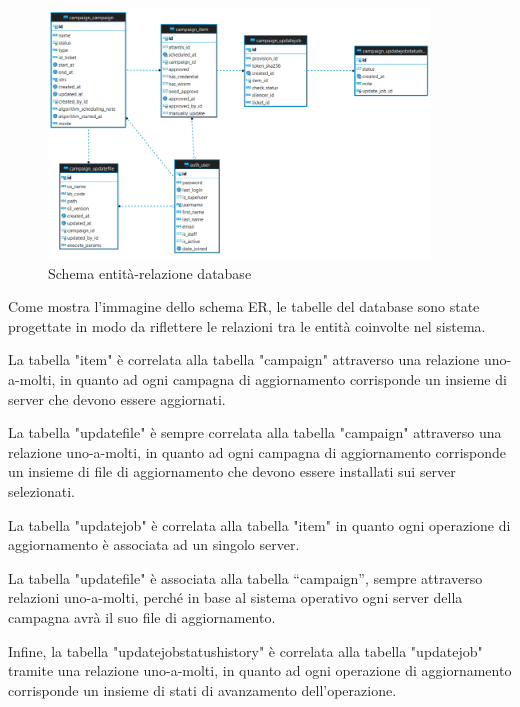 \begin{figure}[H]
  \begin{flushright}
    \centering
    \includegraphics[width=0.90\textwidth]{imgs/ER_schema.png}
    \caption{Schema entità-relazione database}
    \label{fig:Schema entità-relazione database}
  \end{flushright}
\end{figure}

Come mostra l’immagine dello schema ER, le tabelle del database sono state 
progettate in modo da riflettere le relazioni tra le entità coinvolte 
nel sistema.

La tabella "item" è correlata alla tabella "campaign" attraverso una 
relazione uno-a-molti, in quanto ad ogni campagna di aggiornamento 
corrisponde un insieme di server che devono essere aggiornati.

La tabella "updatefile" è sempre correlata alla tabella "campaign" 
attraverso una relazione uno-a-molti, in quanto ad ogni campagna di 
aggiornamento corrisponde un insieme di file di aggiornamento che 
devono essere installati sui server selezionati.

La tabella "updatejob" è correlata alla tabella "item" in quanto ogni 
operazione di aggiornamento è associata ad un singolo server.

La tabella "updatefile" è associata alla tabella “campaign”, sempre 
attraverso relazioni uno-a-molti, perché in base al sistema operativo 
ogni server della campagna avrà il suo file di aggiornamento. 

Infine, la tabella "updatejobstatushistory" è correlata alla tabella 
"updatejob" tramite una relazione uno-a-molti, in quanto ad ogni 
operazione di aggiornamento corrisponde un insieme di stati di 
avanzamento dell'operazione.

